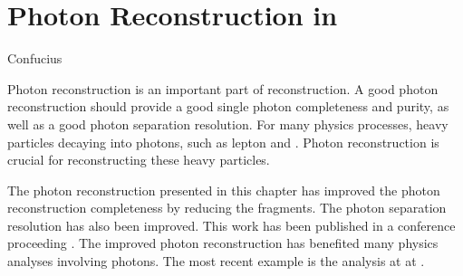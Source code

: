 \chapter{Photon Reconstruction in \pandora}
\label{chap:Photon}

%
{Confucius}


Photon reconstruction is an important part of \pandora reconstruction. A good photon reconstruction should provide a good single photon completeness and purity, as well as a good photon separation resolution. For many physics processes, heavy particles decaying into photons, such as \Ptau lepton and \Ppizero. Photon reconstruction is crucial for reconstructing these heavy particles.

The photon reconstruction presented in this chapter has improved the photon reconstruction completeness by reducing the fragments. The photon separation resolution has  also been improved. This work has been published in a conference proceeding \cite{Xu:2016rcz}. The improved  photon reconstruction has benefited many physics analyses involving photons. The most recent example is the  \HepProcess{\PHiggs \to \Pgamma \Pgamma} analysis at  at \CLIC \cite{Kacarevic:higgsToGammaGamma}.


